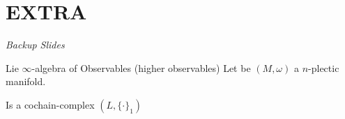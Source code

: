 \documentclass[10pt]{beamer}
\begin{document}
\appendix
\section{EXTRA}
\begin{frame}
	\begin{center}
	\Huge\emph{Backup Slides}
	\end{center}
\end{frame}
\addtocounter{framenumber}{-1}



\begin{frame}[fragile]{Lie $\infty$-algebra of Observables (higher observables) }
	Let be $(M,\omega)$ a $n$-plectic manifold.
	  	\vfill
	\begin{defblock}
		\medskip
		\hspace{.25em} Is a cochain-complex $(L,\{\cdot\}_1)$ \\
		\vspace{-1em}
		\begin{center}
			
		\end{center}
	\end{defblock}
  \end{frame}
\end{document}
